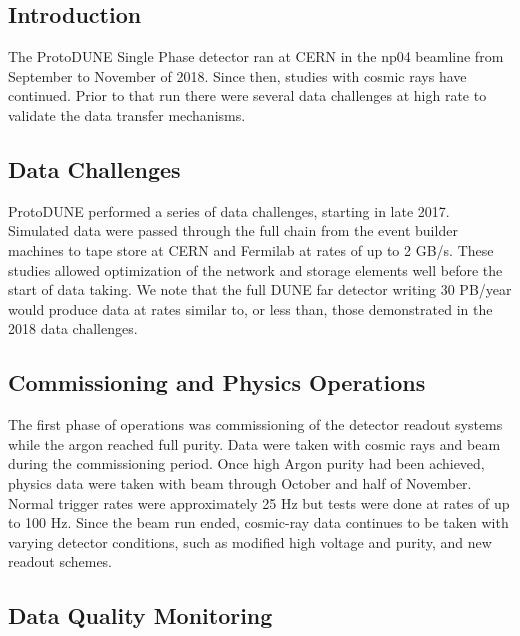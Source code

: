 \subsection{Introduction}

The ProtoDUNE Single Phase detector ran at CERN in the np04 beamline from September to November of 2018. Since then, studies with cosmic rays have continued. Prior to that run there were several data challenges at high rate to validate the data transfer mechanisms.

\subsection{Data Challenges}

ProtoDUNE performed a series of data challenges, starting in late 2017.  Simulated data were passed through the full chain from the event builder machines to tape store at CERN and Fermilab at rates of up to 2 GB/s.  These studies allowed optimization of the network and storage elements well before the start of data taking.
We note that the full DUNE far detector writing 30 PB/year would produce data at rates similar to, or less than, those demonstrated in the 2018 data challenges.

\subsection{Commissioning and Physics Operations}

The first phase of operations was commissioning of the detector readout systems while the argon reached full purity.  Data were taken with cosmic rays and beam during the commissioning period. Once high Argon purity had been achieved, physics data were  taken with beam through October and half of November. Normal trigger rates were approximately 25 Hz but tests were done at rates of up to 100 Hz. Since the beam run ended, cosmic-ray data continues to be taken with varying detector conditions, such as modified high voltage and purity, and new readout schemes.

\subsection{Data Quality Monitoring}



